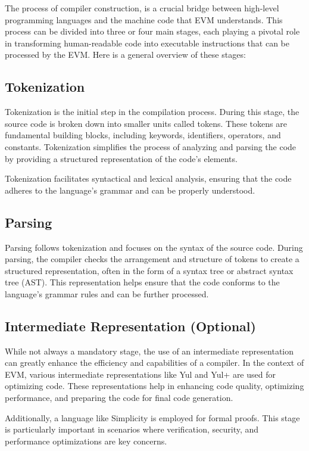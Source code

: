 The process of compiler construction, is a crucial bridge between high-level programming languages and the machine code that EVM understands. This process can be divided into three or four main stages, each playing a pivotal role in transforming human-readable code into executable instructions that can be processed by the EVM. Here is a general overview of these stages:

\subsection{Tokenization}
  Tokenization is the initial step in the compilation process. During this stage, the source code is broken down into smaller units called tokens. These tokens are fundamental building blocks, including keywords, identifiers, operators, and constants. Tokenization simplifies the process of analyzing and parsing the code by providing a structured representation of the code's elements.

  Tokenization facilitates syntactical and lexical analysis, ensuring that the code adheres to the language's grammar and can be properly understood.

\subsection{Parsing}

  Parsing follows tokenization and focuses on the syntax of the source code. During parsing, the compiler checks the arrangement and structure of tokens to create a structured representation, often in the form of a syntax tree or abstract syntax tree (AST). This representation helps ensure that the code conforms to the language's grammar rules and can be further processed.

\subsection{Intermediate Representation (Optional)}

  While not always a mandatory stage, the use of an intermediate representation can greatly enhance the efficiency and capabilities of a compiler. In the context of EVM, various intermediate representations like Yul and Yul+ are used for optimizing code. These representations help in enhancing code quality, optimizing performance, and preparing the code for final code generation.

  Additionally, a language like Simplicity is employed for formal proofs. This stage is particularly important in scenarios where verification, security, and performance optimizations are key concerns.

